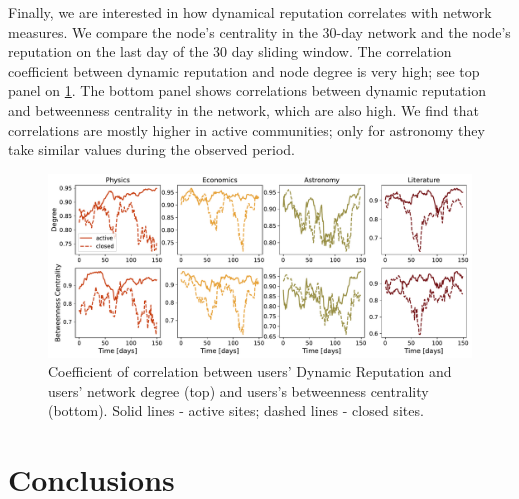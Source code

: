 Finally, we are interested in how dynamical reputation correlates with network measures. We compare the node's centrality in the 30-day network and the node's reputation on the last day of the 30 day sliding window. The correlation coefficient between dynamic reputation and node degree is very high; see top panel on \ref{fig:dyn_rep_centrality}. The bottom panel shows correlations between dynamic reputation and betweenness centrality in the network, which are also high. We find that correlations are mostly higher in active communities; only for astronomy they take similar values during the observed period. 

\begin{figure}[H]
	\centering
	\includegraphics[width=\linewidth]{figures/stackexchange/correlations.pdf}
	\caption{Coefficient of correlation between users' Dynamic Reputation and users' network degree (top) and users's betweenness centrality (bottom). Solid lines - active sites; dashed lines - closed sites.}
	\label{fig:dyn_rep_centrality}
\end{figure}

\section{Conclusions}




